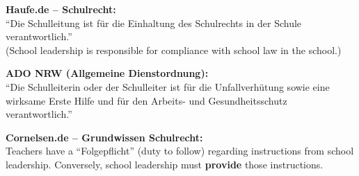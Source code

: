 \documentclass[11pt,a4paper]{article}
\begin{document}
\begin{sourcebox}
\textbf{Haufe.de -- Schulrecht:}\\
``Die Schulleitung ist für die Einhaltung des Schulrechts in der Schule verantwortlich.''\\
(School leadership is responsible for compliance with school law in the school.)

\textbf{ADO NRW (Allgemeine Dienstordnung):}\\
``Die Schulleiterin oder der Schulleiter ist für die Unfallverhütung sowie eine wirksame Erste Hilfe und für den Arbeits- und Gesundheitsschutz verantwortlich.''

\textbf{Cornelsen.de -- Grundwissen Schulrecht:}\\
Teachers have a ``Folgepflicht'' (duty to follow) regarding instructions from school leadership. Conversely, school leadership must \textbf{provide} those instructions.
\end{sourcebox}
\end{document}
